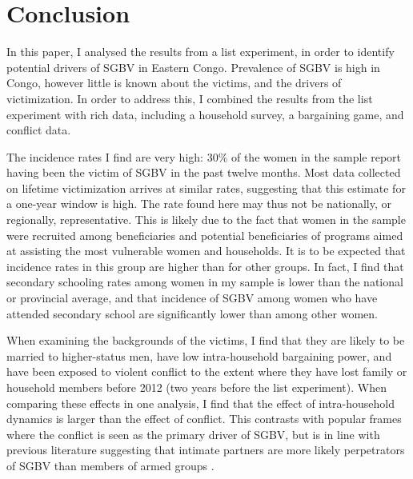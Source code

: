 \section{Conclusion}
In this paper, I analysed the results from a list experiment, in order to identify potential drivers of SGBV in Eastern Congo. Prevalence of SGBV is high in Congo, however little is known about the victims, and the drivers of victimization. In order to address this, I combined the results from the list experiment with rich  data, including a household survey, a bargaining game, and conflict data.

The incidence rates I find are very high: 30\% of the women in the sample report having been the victim of SGBV in the past twelve months. Most data collected on lifetime victimization arrives at similar rates, suggesting that this estimate for a one-year window is high. The rate found here may thus not be nationally, or regionally, representative. This is likely due to the fact that women in the sample were recruited among beneficiaries and potential beneficiaries of programs aimed at assisting the most vulnerable women and households. It is to be expected that incidence rates in this group are higher than for other groups. In fact, I find that secondary schooling rates among women in my sample is lower than the national or provincial average, and that incidence of SGBV among women who have attended secondary school are significantly lower than among other women.

When examining the backgrounds of the victims, I find that they are likely to be married to higher-status men, have low intra-household bargaining power, and have been exposed to violent conflict to the extent where they have lost family or household members before 2012 (two years before the list experiment). When comparing these effects in one analysis, I find that the effect of intra-household dynamics is larger than the effect of conflict. This contrasts with popular frames where the conflict is seen as the primary driver of SGBV, but is in line with previous literature suggesting that intimate partners are more likely perpetrators of SGBV than members of armed groups \citep[see e.g.][]{Peterman2011}.


